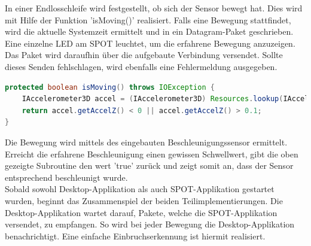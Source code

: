 In einer Endlosschleife wird festgestellt, ob sich der Sensor bewegt hat. Dies wird mit Hilfe der Funktion 'isMoving()' realisiert. Falls eine Bewegung stattfindet, wird die aktuelle Systemzeit ermittelt und in ein Datagram-Paket geschrieben. Eine einzelne LED am SPOT leuchtet, um die erfahrene Bewegung anzuzeigen. Das Paket wird daraufhin über die aufgebaute Verbindung versendet. Sollte dieses Senden fehlschlagen, wird ebenfalls eine Fehlermeldung ausgegeben.\newpage

\begin{lstlisting}[language=Java,caption={Methode zur Bewegungserkennung},label=lst:movement,frame=single] 
protected boolean isMoving() throws IOException {
	IAccelerometer3D accel = (IAccelerometer3D) Resources.lookup(IAccelerometer3D.class);
	return accel.getAccelZ() < 0 || accel.getAccelZ() > 0.1;
}
\end{lstlisting}

Die Bewegung wird mittels des eingebauten Beschleunigungssensor ermittelt. Erreicht die erfahrene Beschleunigung einen gewissen Schwellwert, gibt die oben gezeigte Subroutine den wert 'true' zurück und zeigt somit an, dass der Sensor entsprechend beschleunigt wurde.\\

Sobald sowohl Desktop-Applikation als auch SPOT-Applikation gestartet wurden, beginnt das Zusammenspiel der beiden Teilimplementierungen. Die Desktop-Applikation wartet darauf, Pakete, welche die SPOT-Applikation versendet, zu empfangen. So wird bei jeder Bewegung die Desktop-Applikation benachrichtigt. Eine einfache Einbruchserkennung ist hiermit realisiert.